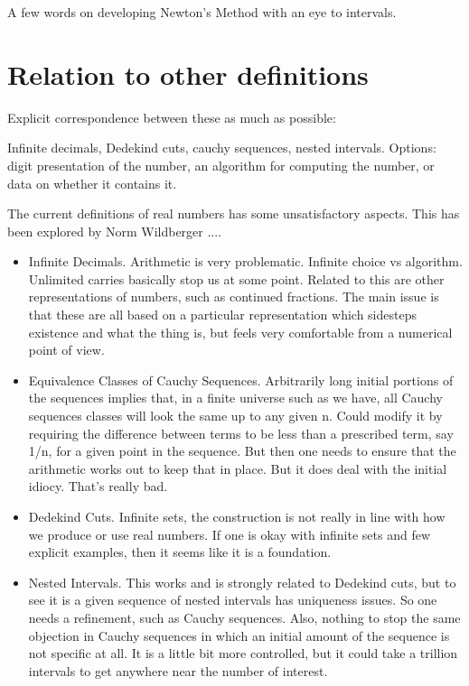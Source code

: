 \documentclass[12pt]{article}
\theoremstyle{remark}
\begin{document}
A few words on developing Newton's Method with an eye to intervals. 

\section{Relation to other definitions}

Explicit correspondence between these as much as possible: 

Infinite decimals, Dedekind cuts, cauchy sequences, nested intervals. 
Options: digit presentation of the number, an algorithm for computing the number,  or data on whether it contains it. 

The current definitions of real numbers has some unsatisfactory aspects. This
has been explored by Norm Wildberger ....

\begin{itemize}
    \item Infinite Decimals. Arithmetic is very problematic. Infinite choice vs
  algorithm. Unlimited carries basically stop us at some point. Related to
  this are other representations of numbers, such as continued fractions. The
  main issue is that these are all based on a particular representation which
  sidesteps existence and what the thing is, but feels very comfortable from a
  numerical point of view. 
  \item Equivalence Classes of Cauchy Sequences. Arbitrarily long initial portions
  of the sequences implies that, in a finite universe such as we have, all
  Cauchy sequences classes will look the same up to any given n. Could modify
  it by requiring the difference between terms to be less than a prescribed
  term, say 1/n, for a given point in the sequence. But then one needs to
  ensure that the arithmetic works out to keep that in place. But it does deal
  with the initial idiocy. That's really bad. 
  \item Dedekind Cuts. Infinite sets, the construction is not really in line with
  how we produce or use real numbers. If one is okay with infinite sets and
  few explicit examples, then it seems like it is a foundation. 
  \item Nested Intervals. This works and is strongly related to Dedekind cuts, but
  to see it is a given sequence of nested intervals has uniqueness issues. So
  one needs a refinement, such as Cauchy sequences. Also, nothing to stop the
  same objection in Cauchy sequences in which an initial amount of the
  sequence is not specific at all. It is a little bit more controlled, but it
  could take a trillion intervals to get anywhere near the number of interest.
\end{itemize}
\end{document}
